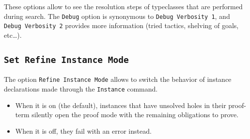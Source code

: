 These options allow to see the resolution steps of typeclasses that are
performed during search. The {\tt Debug} option is synonymous to 
{\tt Debug Verbosity 1}, and {\tt Debug Verbosity 2} provides more
information (tried tactics, shelving of goals, etc\ldots).

\subsection{\tt Set Refine Instance Mode}

The option {\tt Refine Instance Mode} allows to switch the behavior of instance
declarations made through the {\tt Instance} command.
\begin{itemize}
\item When it is on (the default), instances that have unsolved holes in their
proof-term silently open the proof mode with the remaining obligations to prove.
\item When it is off, they fail with an error instead.
\end{itemize}

